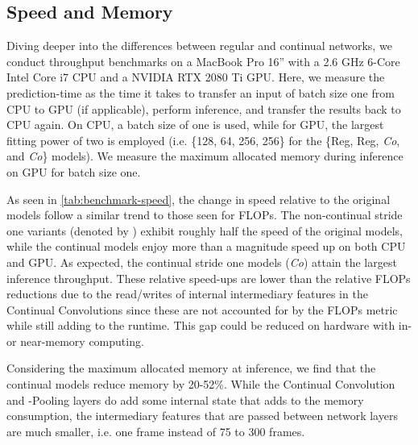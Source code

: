 \documentclass[journal]{IEEEtran}
\theoremstyle{definition}
\begin{document}
\subsection{Speed and Memory}
Diving deeper into the differences between regular and continual networks, we conduct throughput benchmarks on a MacBook Pro 16” with a 2.6 GHz 6-Core Intel Core i7 CPU and a NVIDIA RTX 2080 Ti GPU.
Here, we measure the prediction-time as the time it takes to transfer an input of batch size one from CPU to GPU (if applicable), perform inference, and transfer the results back to CPU again.
On CPU, a batch size of one is used, while for GPU, the largest fitting power of two is employed (i.e. \{128, 64, 256, 256\} for the \{Reg, Reg, \textit{Co}, and \textit{Co}\} models).
We measure the maximum allocated memory during inference on GPU for batch size one.

As seen in \cref{tab:benchmark-speed}, the change in speed relative to the original models follow a similar trend to those seen for FLOPs. The non-continual stride one variants (denoted by ) exhibit roughly half the speed of the original models, while the continual models enjoy more than a magnitude speed up on both CPU and GPU. As expected, the continual stride one models (\textit{Co}) attain the largest inference throughput. These relative speed-ups are lower than the relative FLOPs reductions due to the read/writes of internal intermediary features in the Continual Convolutions since these are not accounted for by the FLOPs metric while still adding to the runtime. This gap could be reduced on hardware with in- or near-memory computing.

Considering the maximum allocated memory at inference, 
we find that the continual models reduce memory by 20-52\%. While the Continual Convolution and -Pooling layers do add some internal state that adds to the memory consumption, the intermediary features that are passed between network layers are much smaller, i.e. one frame instead of 75 to 300 frames.
\end{document}
